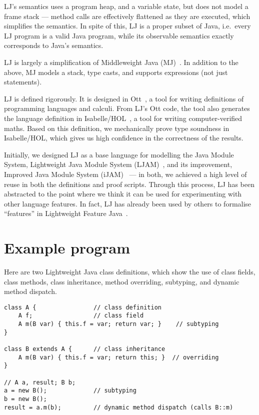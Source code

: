 \documentclass[11pt,a4paper]{article}
\newcommand{\ie}{i.e.~}
\begin{document}
LJ's semantics uses a program heap, and a variable state, but does not model a
frame stack --- method calls are effectively flattened as they are executed,
which simplifies the semantics. In spite of this, LJ is a proper subset of
Java, \ie every LJ program is a valid Java program, while its observable
semantics exactly corresponds to Java's semantics.

LJ is largely a simplification of Middleweight Java (MJ)~\cite{mj-matt}. In
addition to the above, MJ models a stack, type casts, and supports expressions
(not just statements).

LJ is defined rigorously. It is designed in Ott~\cite{ott}, a tool for writing
definitions of programming languages and calculi. From LJ's Ott code, the tool
also generates the language definition in Isabelle/HOL~\cite{isabelle}, a tool
for writing computer-verified maths. Based on this definition, we mechanically
prove type soundness in Isabelle/HOL, which gives us high confidence in the
correctness of the results.

Initially, we designed LJ as a base language for modelling the Java Module
System, Lightweight Java Module System (LJAM)~\cite{ljam}, and its improvement,
Improved Java Module System (iJAM)~\cite{iJAM} --- in both, we achieved a high
level of reuse in both the definitions and proof scripts.  Through this
process, LJ has been abstracted to the point where we think it can be used for
experimenting with other language features. In fact, LJ has already been used
by others to formalise ``features'' in Lightweight Feature Java~\cite{lfj}.

\section{Example program}

Here are two Lightweight Java class definitions, which show the use of class fields,
class methods, class inheritance, method overriding, subtyping, and dynamic
method dispatch.

\begin{lstlisting}
class A {                // class definition
    A f;                 // class field
    A m(B var) { this.f = var; return var; }    // subtyping
}

class B extends A {      // class inheritance
    A m(B var) { this.f = var; return this; }  // overriding
}

// A a, result; B b;
a = new B();             // subtyping
b = new B();
result = a.m(b);         // dynamic method dispatch (calls B::m)
\end{lstlisting}
\end{document}
